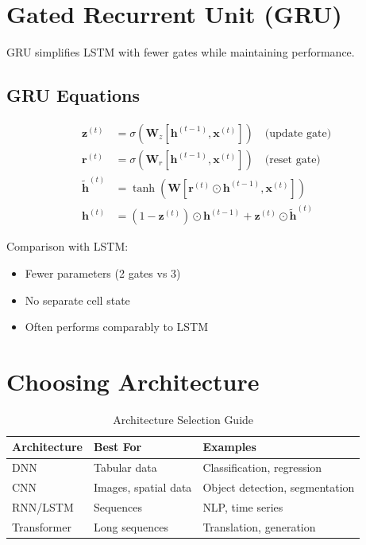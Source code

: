 \section{Gated Recurrent Unit (GRU)}

GRU \cite{cho2014properties} simplifies LSTM with fewer gates while maintaining performance.

\subsection{GRU Equations}
\begin{align}
\mathbf{z}^{(t)} &= \sigma(\mathbf{W}_z[\mathbf{h}^{(t-1)}, \mathbf{x}^{(t)}]) \quad \text{(update gate)} \\
\mathbf{r}^{(t)} &= \sigma(\mathbf{W}_r[\mathbf{h}^{(t-1)}, \mathbf{x}^{(t)}]) \quad \text{(reset gate)} \\
\tilde{\mathbf{h}}^{(t)} &= \tanh(\mathbf{W}[\mathbf{r}^{(t)} \odot \mathbf{h}^{(t-1)}, \mathbf{x}^{(t)}]) \\
\mathbf{h}^{(t)} &= (1 - \mathbf{z}^{(t)}) \odot \mathbf{h}^{(t-1)} + \mathbf{z}^{(t)} \odot \tilde{\mathbf{h}}^{(t)}
\end{align}

Comparison with LSTM:
\begin{itemize}
    \item Fewer parameters (2 gates vs 3)
    \item No separate cell state
    \item Often performs comparably to LSTM
\end{itemize}

\section{Choosing Architecture}

\begin{table}[ht]
    \centering
    \caption{Architecture Selection Guide}
    \begin{tabular}{L{2.5cm} L{3.5cm} L{4cm}}
        \toprule
        \textbf{Architecture} & \textbf{Best For} & \textbf{Examples} \\
        \midrule
        DNN & Tabular data & Classification, regression \\
        CNN & Images, spatial data & Object detection, segmentation \\
        RNN/LSTM & Sequences & NLP, time series \\
        Transformer & Long sequences & Translation, generation \\
        \bottomrule
    \end{tabular}
\end{table}

